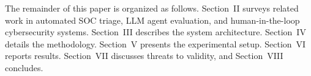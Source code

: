 The remainder of this paper is organized as follows. Section~II surveys related work in
automated SOC triage, LLM agent evaluation, and human-in-the-loop cybersecurity systems.
Section~III describes the system architecture. Section~IV details the methodology.
Section~V presents the experimental setup. Section~VI reports results. Section~VII
discusses threats to validity, and Section~VIII concludes.
